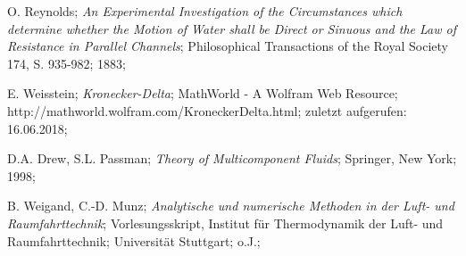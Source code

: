 

\begin{thebibliography}{4}		%
		
	O. Reynolds;
	\textit{An Experimental Investigation of the Circumstances which determine whether the Motion of Water shall be Direct or Sinuous and the Law of Resistance in Parallel Channels};
	Philosophical Transactions of the Royal Society 174, S. 935-982;
	1883;

	E. Weisstein;
	\textit{Kronecker-Delta};
	MathWorld - A Wolfram Web Resource;
	http://\-mathworld.wolfram.com/\-KroneckerDelta.html;
	zuletzt aufgerufen: 16.06.2018;
	
	D.A. Drew, S.L. Passman;
	\textit{Theory of Multicomponent Fluids};
	Springer, New York;
	1998;
	
	B. Weigand, C.-D. Munz;
	\textit{Analytische und numerische Methoden in der Luft- und Raumfahrttechnik};
	Vorlesungsskript, Institut für Thermodynamik der Luft- und Raumfahrttechnik;
	Universität Stuttgart;
	o.J.;
	
\end{thebibliography}